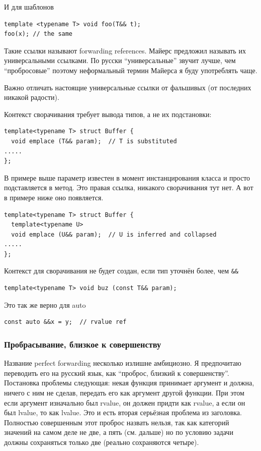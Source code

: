 \documentclass[a4paper,12pt,oneside]{article}
\begin{document}
И для шаблонов

\begin{lstlisting}
template <typename T> void foo(T&& t);
foo(x); // the same
\end{lstlisting}

Такие ссылки называют forwarding references. Майерс предложил называть их универсальными ссылками. По русски ``универсальные'' звучит лучше, чем ``пробросовые'' поэтому неформальный термин Майерса я буду употреблять чаще.

Важно отличать настоящие универсальные ссылки от фальшивых (от последних никакой радости).

Контекст сворачивания требует вывода типов, а не их подстановки:

\begin{lstlisting}
template<typename T> struct Buffer {
  void emplace (T&& param);  // T is substituted
.....
};
\end{lstlisting}

В примере выше параметр известен в момент инстанцирования класса и просто подставляется в метод. Это правая ссылка, никакого сворачивания тут нет. А вот в примере ниже оно появляется.

\begin{lstlisting}
template<typename T> struct Buffer {
  template<typename U>
  void emplace (U&& param);  // U is inferred and collapsed
.....
};
\end{lstlisting}

Контекст для сворачивания не будет создан, если тип уточнён более, чем \lstinline!&&!

\begin{lstlisting}
template<typename T> void buz (const T&& param); 
\end{lstlisting}

Это так же верно для auto

\begin{lstlisting}
const auto &&x = y;  // rvalue ref 
\end{lstlisting}

\subsubsection{Пробрасывание, близкое к совершенству}\label{PerfectForw}

Название perfect forwarding несколько излишне амбициозно. Я предпочитаю переводить его на русский язык, как ``проброс, близкий к совершенству''. Постановка проблемы следующая: некая функция принимает аргумент и должна, ничего с ним не сделав, передать его как аргумент другой функции. При этом если аргумент изначально был rvalue, он должен придти как rvalue, а если он был lvalue, то как lvalue. Это и есть вторая серьёзная проблема из заголовка. Полностью совершенным этот проброс назвать нельзя, так как категорий значений на самом деле не две, а пять (см. дальше) но по условию задачи должны сохраняться только две (реально сохраняются четыре).
\end{document}
